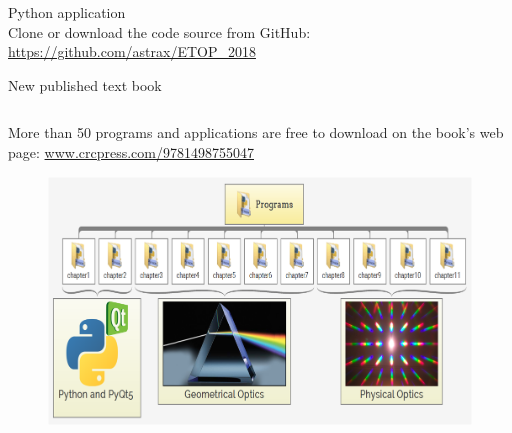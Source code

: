 \documentclass[serif ,mathserif, 8pt]{beamer}
\begin{document}
\begin{frame}{Python application}
	\centering
	\\
	Clone or download the code source from GitHub:\\
	\url{https://github.com/astrax/ETOP_2018}	
\end{frame}


\begin{frame}{New published text book}
\begin{columns}[c]
	\begin{column}{0.6\textwidth}
		More than 50 programs and applications are free to download on the book's web page: \url{www.crcpress.com/9781498755047}
		
		\begin{figure}
			\includegraphics[width=\linewidth]{images/Image4}
			
		\end{figure}
		

\end{column}
\end{columns}
\end{frame}
\end{document}
